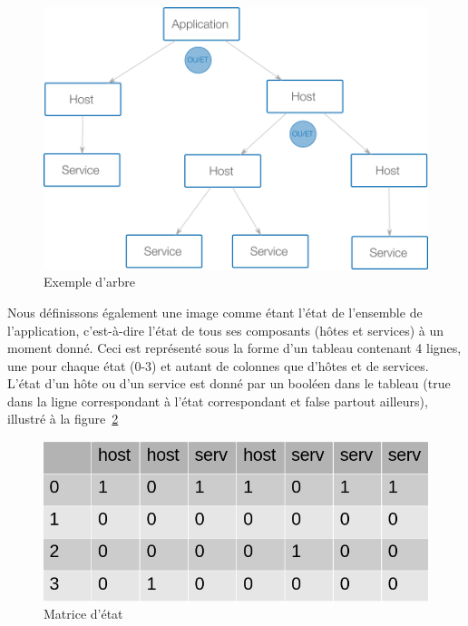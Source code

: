 \documentclass[10pt,a4paper,oneside]{article}
\begin{document}
\begin{figure}
\centering
\includegraphics[scale=0.5]{./images/PNG/abrerelation.png}
\caption{Exemple d'arbre}
\label{exampletree}
\end{figure}

\vspace{0.8cm}

\begin{multicols}{2}
Nous définissons également une image comme étant l’état de l’ensemble de l’application, c’est-à-dire l’état de tous ses composants (hôtes et services) à un moment donné. Ceci est représenté sous la forme d'un tableau contenant 4 lignes, une pour chaque état (0-3) et autant de colonnes que d'hôtes et de services. L'état d'un hôte ou d'un service est donné par un booléen dans le tableau (true dans la ligne correspondant à l'état correspondant et false partout ailleurs), illustré à la figure~\ref{tab}

\end{multicols}

\vspace{0.8cm}

\begin{figure}[!h]
\centering
\includegraphics[scale=0.5]{./images/image.png}
\caption{Matrice d'état}
\label{tab}
\end{figure}
\end{document}
